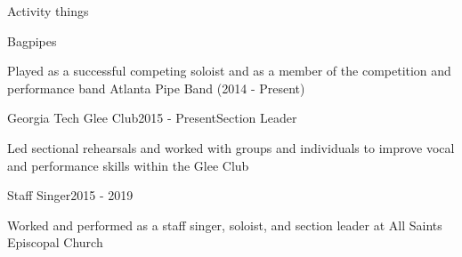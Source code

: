 \documentclass{resume} %
\begin{document}
\begin{rSection}{Activity things}

  \begin{rSubsection}{Bagpipes}{}{}{}
  \item Played as a successful competing soloist and as a member of the competition and performance band Atlanta Pipe Band (2014 - Present)
  \end{rSubsection}
  \begin{rSubsection}{Georgia Tech Glee Club}{2015 - Present}{Section Leader}{}
  \item Led sectional rehearsals and worked with groups and individuals to improve vocal and performance skills within the Glee Club
  \end{rSubsection}

  \begin{rSubsection}{Staff Singer}{2015 - 2019}{}{}
  \item Worked and performed as a staff singer, soloist, and section leader at All Saints Episcopal Church 
  \end{rSubsection}
\end{rSection}
\fi
\end{document}
